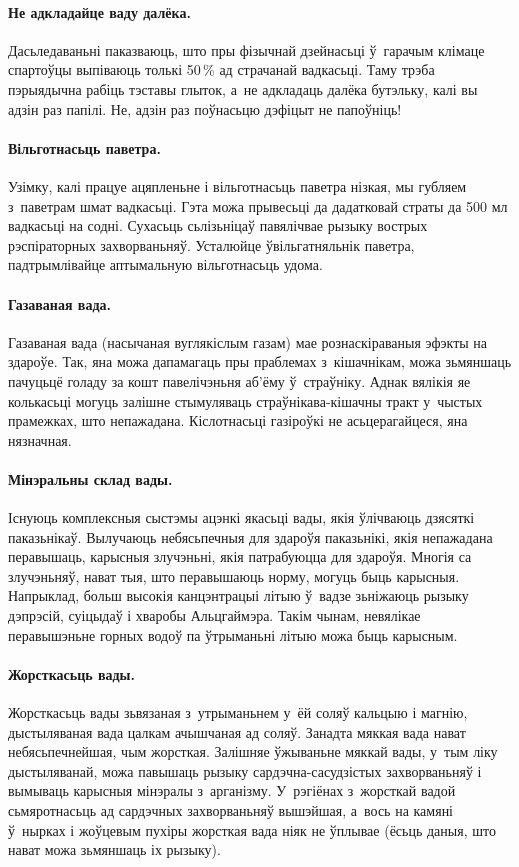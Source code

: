 \paragraph{Не адкладайце ваду далёка.}
Дасьледаваньні паказваюць, што пры фізычнай дзейнасьці ў~гарачым клімаце спартоўцы выпіваюць толькі 50\,\% ад страчанай вадкасьці. Таму трэба пэрыядычна рабіць тэставы глыток, а~не адкладаць далёка бутэльку, калі вы адзін раз папілі. Не, адзін раз поўнасьцю дэфіцыт не папоўніць!

\paragraph{Вільготнасьць паветра.}
Узімку, калі працуе ацяпленьне і вільготнасьць паветра нізкая, мы губляем з~паветрам шмат вадкасьці. Гэта можа прывесьці да дадатковай страты да 500 мл вадкасьці на содні. Сухасьць сьлізьніцаў павялічвае рызыку вострых рэспіраторных захворваньняў. Усталюйце ўвільгатняльнік паветра, падтрымлівайце аптымальную вільготнасьць удома.

\paragraph{Газаваная вада.}
Газаваная вада (насычаная вуглякіслым газам) мае рознаскіраваныя эфэкты на здароўе. Так, яна можа дапамагаць пры праблемах з~кішачнікам, можа зьмяншаць пачуцьцё голаду за кошт павелічэньня аб'ёму ў~страўніку. Аднак вялікія яе колькасьці могуць залішне стымуляваць страўнікава-кішачны тракт у~чыстых прамежках, што непажадана. Кіслотнасьці газіроўкі не асьцерагайцеся, яна нязначная.

\paragraph{Мінэральны склад вады.}
Існуюць комплексныя сыстэмы ацэнкі якасьці вады, якія ўлічваюць дзясяткі паказьнікаў. Вылучаюць небясьпечныя для здароўя паказьнікі, якія непажадана перавышаць, карысныя злучэньні, якія патрабуюцца для здароўя. Многія са злучэньняў, нават тыя, што перавышаюць норму, могуць быць карысныя. Напрыклад, больш высокія канцэнтрацыі літыю ў~вадзе зьніжаюць рызыку дэпрэсій, суіцыдаў і хваробы Альцгаймэра. Такім чынам, невялікае перавышэньне горных водоў па ўтрыманьні літыю можа быць карысным.

\paragraph{Жорсткасьць вады.}
Жорсткасьць вады зьвязаная з~утрыманьнем у~ёй соляў кальцыю і магнію, дыстыляваная вада цалкам ачышчаная ад соляў. Занадта мяккая вада нават небясьпечнейшая, чым жорсткая. Залішняе ўжываньне мяккай вады, у~тым ліку дыстыляванай, можа павышаць рызыку сардэчна-сасудзістых захворваньняў і вымываць карысныя мінэралы з~арганізму. У~рэгіёнах з~жорсткай вадой сьмяротнасьць ад сардэчных захворваньняў вышэйшая, а~вось на камяні ў~нырках і жоўцевым пухіры жорсткая вада ніяк не ўплывае (ёсьць даныя, што нават можа зьмяншаць іх рызыку).

